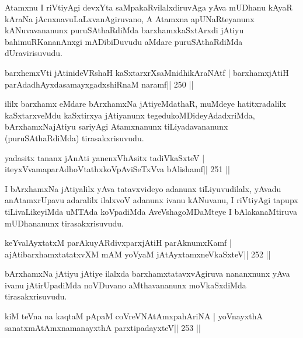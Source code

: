 \begin{artha}
Atamxnu I riVtiyAgi devxYta saMpakaRvilalxdiruvAga yAva mUDhanu kAyaR kAraNa jAcnxnavuLaLxvanAgiruvano, A Atamxna apUNaRteyanunx kANuvavananunx puruSAthaRdiMda barxhamxkaSxtArxdi jAtiyu bahimuRKananAnxgi mADibiDuvudu aMdare puruSAthaRdiMda dUravirisuvudu.
\end{artha}


\begin{shl}
barxhemxVti jAtinideVRshaH kaSxtarxrXsaMnidhikAraNAtf |
barxhamxjAtiH parAdadhAyxdasamayxgadxshiRnaM naramf\hfill || 250 ||
\end{shl}

\begin{artha}
ililx barxhamx eMdare bArxhamxNa jAtiyeMdathaR, muMdeye hatitxradalilx kaSxtarxveMdu kaSxtirxya jAtiyanunx tegedukoMDideyAdadxriMda, bArxhamxNajAtiyu sariyAgi Atamxnanunx tiLiyadavananunx (puruSAthaRdiMda) tirasakxrisuvudu.
\end{artha}


\begin{shl}
yadasitx tananx jAnAti yanenxVhAsitx tadiVkaSxteV |
iteyxVvamaparAdhoVtathxkoVpAviSeTxVva bAlishamf\hfill || 251 ||
\end{shl}

\begin{artha}
I bArxhamxNa jAtiyalilx yAva tatavxvideyo adanunx tiLiyuvudilalx, yAvadu anAtamxrUpavu adaralilx ilalxvoV adanunx ivanu kANuvanu, I riVtiyAgi tapupx tiLivaLikeyiMda uMTAda koVpadiMda AveVshagoMDaMteye I bAlakanaMtiruva mUDhananunx \mdash tirasakxrisuvudu.
\end{artha}

\begin{shl}
keYvalAyxtatxM parAkuyARdivxparxjAtiH parAknumxKamf |
ajAtibarxhamxtatatxvXM mAM yoV\s yaM jAtAyxtamxneVkaSxteV\hfill || 252 ||
\end{shl}

\begin{artha}
bArxhamxNa jAtiyu jAtiye ilalxda barxhamxtatavxvAgiruva nananxnunx yAva ivanu jAtirUpadiMda noVDuvano aMthavananunx moVkaSxdiMda tirasakxrisuvudu.
\end{artha}


\begin{shl}
kiM teVna na kaqtaM pApaM coVreVNA\s\s tAmxpahAriNA |
yoV\s nayxthA sanatxmAtAmxnamanayxthA parxtipadayxteV\hfill || 253 ||
\end{shl}

